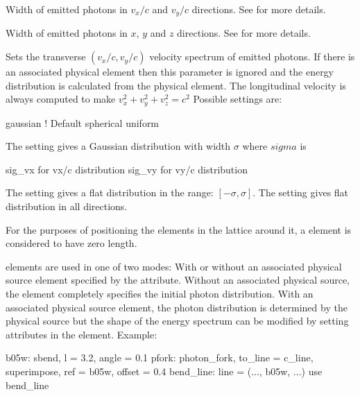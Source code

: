 {\begin{description}
  \item[\vn{sig_vx, sig_vy}] \Newline
Width of emitted photons in $v_x/c$ and $v_y/c$ directions. See
 for more details.

  \item[\vn{sig_x, sig_y, sig_z}] \Newline
Width of emitted photons in $x$, $y$ and $z$ directions. See
 for more details.

  \item[\vn{velocity_distribution}] \Newline
Sets the transverse $(v_x/c, v_y/c)$ velocity spectrum of emitted
photons. If there is an associated physical element then this
parameter is ignored and the energy distribution is calculated from
the physical element. The longitudinal velocity is always computed to
make $v_x^2 + v_y^2 + v_z^2 = c^2$ Possible settings are:
\begin{example2}
  gaussian    ! Default
  spherical
  uniform
\end{example2}
The  setting gives a Gaussian distribution with width
$\sigma$ where $sigma$ is 
\begin{example2}
  sig_vx     for vx/c distribution
  sig_vy     for vy/c distribution
\end{example2}
The  setting gives a flat distribution in the range:
$[-\sigma, \sigma]$.
The  setting gives flat distribution in all directions.
  \end{description}

For the purposes of positioning the elements in the lattice around it,
a  element is considered to have zero length.

 elements are used in one of two modes: With or
without an associated physical source element specified by the
 attribute. Without an associated physical source,
the  element completely specifies the initial photon
distribution. With an associated physical source element, the photon
distribution is determined by the physical source but the shape of the
energy spectrum can be modified by setting attributes in the
 element. Example:
\begin{example}
  b05w: sbend, l = 3.2, angle = 0.1
  pfork: photon_fork, to_line = c_line, superimpose, ref = b05w, offset = 0.4
  bend_line: line = (..., b05w, ...)
  use bend_line


\end{example}}
